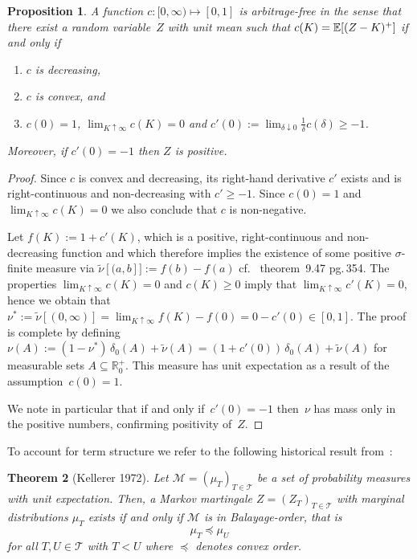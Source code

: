 \documentclass[twoside]{article}
\DeclareRobustCommand{\R}{\mathbb{R}}
\theoremstyle{plain}
\newtheorem{theorem}{Theorem}[section]        %
\newtheorem{proposition}[theorem]{Proposition}
\theoremstyle{definition}
\theoremstyle{remark}
\begin{document}
\begin{proposition}\label{prop:arbfreemart}
A function $c:[0,\infty)\mapsto[0,1]$ is arbitrage-free in the sense that there exist a random variable~$Z$
with unit mean such that $c(K)=\mathbb{E}[ (Z-K)^+]$ if and only if
\begin{enumerate}
    \item $c$ is decreasing,
    \item $c$ is convex, and
    \item $c(0)=1$, \label{it:noarbnbo}
$\lim_{K\uparrow \infty} c(K) = 0$ and
                              $c'(0):=\lim_{\delta\downarrow 0} \mbox{$\frac1\delta$} c(\delta)\geq -1$.
\end{enumerate}
Moreover, if $c'(0)=-1$ then $Z$ is positive.
\end{proposition}
\begin{proof}
    Since $c$ is convex and decreasing, its right-hand derivative $c'$
    exists and is right-continuous and non-decreasing with $c'\geq -1$. Since $c(0)=1$ and $\lim_{K\uparrow \infty} c(K)=0$
    we also conclude that $c$ is non-negative.
    
    Let $f(K) := 1 + c'(K)$, which is
    a positive, right-continuous and non-decreasing function and which
    therefore implies the existence of some positive $\sigma$-finite measure via
    $\tilde \nu[(a,b]]:=f(b)-f(a)$ cf.~\cite{Aliprantis99InfiniteDimAnalysis} theorem~9.47 pg.\,354.
    The properties $\lim_{K\uparrow\infty} c(K) = 0$ and $c(K) \geq 0$
    imply that $\lim_{K\uparrow\infty} c'(K) = 0$,
    hence we obtain that $\nu^*:=\tilde \nu[(0,\infty)]
    = \lim_{K\uparrow \infty} f(K) - f(0) = 0 - c'(0) \in [0,1]$.    
    The proof
    is complete by defining
    $
        \nu(A) := (1-\nu^*)\, \delta_{0}(A) + \tilde \nu(A)
        = (1+c'(0))\, \delta_{0}(A) + \tilde \nu(A)
    $
    for measurable sets $A \subseteq \R^+_0$. 
    This measure has unit expectation
    as a result of the assumption~$c(0)=1$.

    We note in particular that if and only if~$c'(0)=-1$ then~$\nu$ has mass only in the positive
    numbers, confirming positivity of~$Z$.
\end{proof}

\noindent
To account for term structure we refer to the following historical result from~\cite{Kellerer1972}:

\begin{theorem}[Kellerer 1972]\label{th:kellerer}
     Let $\mathcal{M}=(\mu_T)_{T\in\mathcal{T}}$ be a set of probability
     measures with unit expectation.
     Then, a Markov martingale $Z=(Z_T)_{T\in\mathcal{T}}$ with marginal distributions $\mu_T$
     exists if and only if $\mathcal{M}$ is in Balayage-order, that is
     \[
        \mu_T \preceq \mu_U
     \]
     for all $T,U\in\mathcal{T}$ with $T<U$ where $\preceq$ denotes convex order.
\end{theorem}
\end{document}
